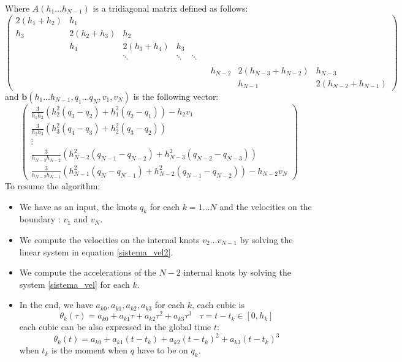 \documentclass[10pt, letterpaper]{report}
\begin{document}
Where $A(h_1\dots h_{N-1})$ is a tridiagonal matrix defined as follows:\begin{equation}
    \begin{pmatrix}
        2(h_1+h_2)&h_1 \\ 
        h_3&2(h_2+h_3)&h_2 \\ 
        & h_4&2(h_3+h_4)&h_3 \\ 
         & & \ddots& \ddots& \ddots& \\ \\
        & & & & & & h_{N-2}&2(h_{N-3}+h_{N-2})&h_{N-3} \\
        & & & & & & &h_{N-1}&2(h_{N-2}+h_{N-1})
    \end{pmatrix}
\end{equation}
and $\mathbf b(h_1\dots h_{N-1},q_1\dots q_N,v_1,v_N)$ is the following vector:\begin{equation}
\begin{pmatrix}
\frac{3}{h_1 h_2} \left( h_2^2 ({q}_3 - {q}_2) + h_1^2 ({q}_2 - {q}_1) \right) - h_2 v_1 \\
\frac{3}{h_2 h_3} \left( h_3^2 ({q}_4 - {q}_3) + h_2^2 ({q}_3 - {q}_2) \right) \\
\vdots \\
\frac{3}{h_{N-3} h_{N-2}} \left( h_{N-2}^2 ({q}_{N-1} - {q}_{N-2}) + h_{N-3}^2 ({q}_{N-2} - {q}_{N-3}) \right) \\
\frac{3}{h_{N-2} h_{N-1}} \left( h_{N-1}^2 ({q}_N - {q}_{N-1}) + h_{N-2}^2 ({q}_{N-1} - {q}_{N-2}) \right) - h_{N-2} v_N
\end{pmatrix}
\end{equation}
To resume the algorithm:\begin{itemize}
    \item We have as an input, the knots $q_k$ for each $k=1\dots N$ and the velocities on the boundary : $v_1$ and $v_N$.
    \item We compute the velocities on the internal knots $v_2\dots v_{N-1}$ by solving the linear system in equation \eqref{sistema_vel2}. 
    \item We compute the accelerations of the $N-2$ internal knots by solving the system \eqref{sistema_vel} for each $k$. 
    \item In the end, we have $a_{k0},a_{k1},a_{k2},a_{k3}$ for each $k$, each cubic is\begin{equation}
        \theta_k(\tau)=a_{k0}+a_{k1}\tau+a_{k2}\tau^2+a_{k3}\tau^3 \ \ \ \ \tau=t-t_k\in[0,h_k]
    \end{equation}
    each cubic can be also expressed in the global time $t$:\begin{equation}
        \theta_k(t)=a_{k0}+a_{k1}(t-t_k)+a_{k2}(t-t_k)^2+a_{k3}(t-t_k)^3
    \end{equation}
    when $t_k$ is the moment when $q$ have to be on $q_k$.
\end{itemize}
\end{document}
